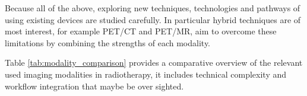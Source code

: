 \documentclass[11pt]{article} %
\begin{document}
\begin{multicols}{2}
Because all of the above, exploring new techniques, technologies and pathways of using existing devices are studied carefully. In particular hybrid techniques are of most interest, for example PET/CT and PET/MR, aim to overcome these limitations by combining the strengths of each modality. 

Table \ref{tab:modality_comparison} provides a comparative overview of the relevant used imaging modalities in radiotherapy, it includes technical complexity and workflow integration that maybe be over sighted.

\end{multicols}
\end{document}

